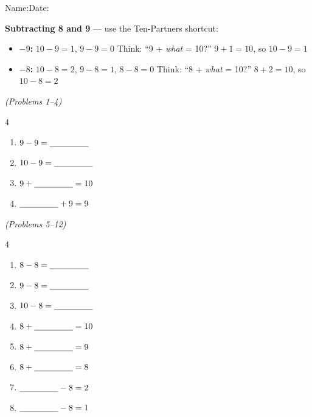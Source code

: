 \documentclass[12pt, letterpaper]{article}
\begin{document}

{\small Name:\ansblanklg \hfill Date:\ansblank}
\goldrule

\begin{instructbox}
\textbf{Subtracting 8 and 9} — use the Ten-Partners shortcut:
\begin{itemize}
  \item \textbf{$-9$:} \quad $10-9=1$, $9-9=0$ \quad Think: ``9 + \textit{what} = 10?'' \quad $9+1=10$, so $10-9=1$
  \item \textbf{$-8$:} \quad $10-8=2$, $9-8=1$, $8-8=0$ \quad Think: ``8 + \textit{what} = 10?'' \quad $8+2=10$, so $10-8=2$
\end{itemize}
\end{instructbox}

\bigskip
{} \hfill \textit{(Problems 1–4)}

\bigskip
\begin{multicols}{4}
\begin{enumerate}[leftmargin=*,label=\textbf{\arabic*.},itemsep=10pt]
  \item $9-9=\underline{\hspace{1.6cm}}$
  \item $10-9=\underline{\hspace{1.6cm}}$
  \item $9+\underline{\hspace{1.6cm}}=10$
  \item $\underline{\hspace{1.6cm}}+9=9$
\end{enumerate}
\end{multicols}

\bigskip\bigskip
{} \hfill \textit{(Problems 5–12)}

\bigskip
\begin{multicols}{4}
\begin{enumerate}[leftmargin=*,label=\textbf{\arabic*.},itemsep=10pt,start=5]
  \item $8-8=\underline{\hspace{1.6cm}}$
  \item $9-8=\underline{\hspace{1.6cm}}$
  \item $10-8=\underline{\hspace{1.6cm}}$
  \item $8+\underline{\hspace{1.6cm}}=10$
  \item $8+\underline{\hspace{1.6cm}}=9$
  \item $8+\underline{\hspace{1.6cm}}=8$
  \item $\underline{\hspace{1.6cm}}-8=2$
  \item $\underline{\hspace{1.6cm}}-8=1$
\end{enumerate}
\end{multicols}
\end{document}
